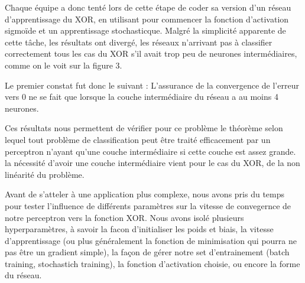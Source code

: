 \documentclass[
    10pt,
    a4paper,
    oneside,
    headinclude,footinclude,
    BCOR=5mm,
    captions=tableabove
]{scrartcl}
\begin{document}
 Chaque équipe a donc tenté lors de cette étape de coder sa version d'un réseau d'apprentissage du XOR, en utilisant pour commencer la fonction d'activation sigmoïde et un apprentissage stochasticque. Malgré la simplicité apparente de cette tâche, les résultats ont divergé, les réseaux n'arrivant pas à classifier correctement tous les cas du XOR s'il avait trop peu de neurones intermédiaires, comme on le voit sur la figure 3.

Le premier constat fut donc le suivant : L'assurance de la convergence de l'erreur vers $0$ ne se fait que lorsque la couche intermédiaire du réseau a au moins 4 neurones.

Ces résultats nous permettent de vérifier pour ce problème le théorème selon lequel tout problème de classification peut être traité efficacement par un perceptron n'ayant qu'une couche intermédiaire si cette couche est assez grande. la nécessité d'avoir une couche intermédiaire vient pour le cas du XOR, de la non linéarité du problème.

Avant de s'atteler à une application plus complexe, nous avons pris du temps pour tester l'influence de différents paramètres sur la vitesse de convegernce de notre perceptron vers la fonction XOR. 
Nous avons isolé plusieurs hyperparamètres, à savoir  la facon d'initialiser les poids et biais, la vitesse d'apprentissage (ou plus généralement la fonction de minimisation qui pourra ne pas être un gradient simple), la façon de gérer notre set d'entrainement (batch training, stochastich training), la fonction d'activation choisie, ou encore la forme du réseau.
\end{document}
